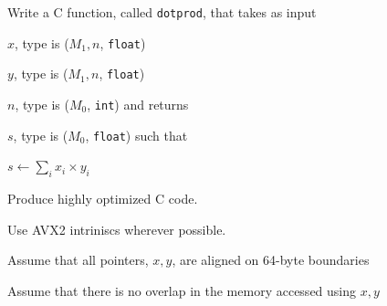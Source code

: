\documentclass[letterpaper,12pt]{article}
\begin{document}



Write a C function, called {\tt dotprod}, that takes as input
\be
\item \(x\), type is (\(M_1, n\), {\tt float})
\item \(y\), type is (\(M_1, n\), {\tt float})
\item \(n\), type is (\(M_0\), {\tt int})
\ee
and returns 
\be
\item \(s\), type is (\(M_0\), {\tt float})
\ee
such that 
\be
\item \(s \leftarrow \sum_i x_i \times y_i\) 
  \ee

  \be
\item Produce highly optimized C code.
\item Use AVX2 intriniscs wherever possible.
\item Assume that all pointers, \(x, y\), are aligned on 64-byte boundaries
\item Assume that there is no overlap in the memory accessed using \(x, y\)
  \ee
\end{document}
